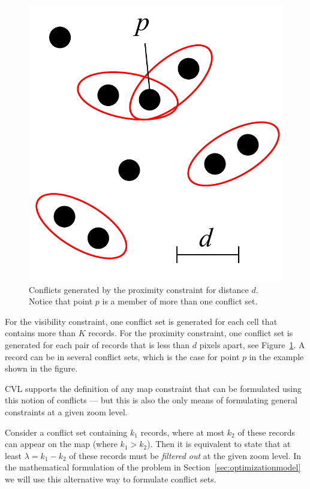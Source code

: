 \begin{figure}[htbp]
\begin{center}
\includegraphics[scale=.3]{figs/cvl_proximity_conflicts.pdf}
\caption{Conflicts generated by the proximity constraint for distance $d$. Notice that point $p$ is a member of more than one conflict set.}
\label{fig:proximity:conflict}
\end{center}
\end{figure}

\vspace{5em}

For the visibility constraint, one conflict set is generated for each cell that contains more than $K$ records. For the proximity constraint, one conflict set is generated for each pair of records that is less than $d$ pixels apart, see Figure~\ref{fig:proximity:conflict}. A record can be in several conflict sets, which is the case for point $p$ in the example shown in the figure.

CVL supports the definition of any map constraint that can be formulated using this notion of conflicts --- but this is also the only means of formulating general constraints at a given zoom level. 

Consider a conflict set containing $k_1$ records, where at most $k_2$ of these records can appear on the map (where $k_1 > k_2$). Then it is equivalent to state that at least $\lambda = k_1 - k_2$ of these records must be \emph{filtered out} at the given zoom level. In the mathematical formulation of the problem in Section~\ref{sec:optimizationmodel} we will use this alternative way to formulate conflict sets.

